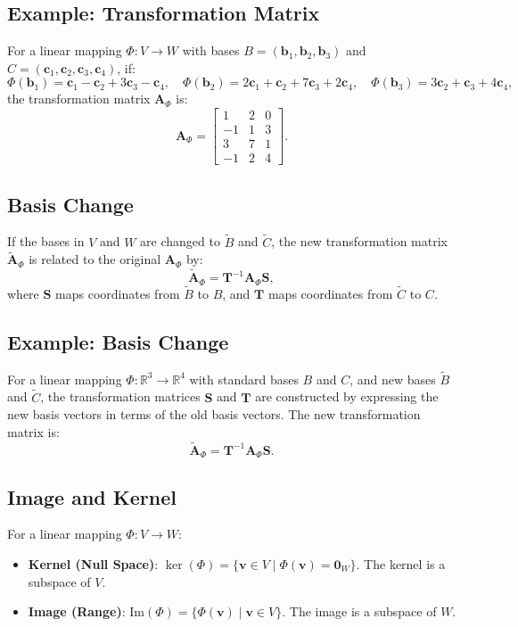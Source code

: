 \subsection{Example: Transformation Matrix}
For a linear mapping \(\Phi: V \to W\) with bases \(B = (\mathbf{b}_1, \mathbf{b}_2, \mathbf{b}_3)\) and \(C = (\mathbf{c}_1, \mathbf{c}_2, \mathbf{c}_3, \mathbf{c}_4)\), if:
\[
\Phi(\mathbf{b}_1) = \mathbf{c}_1 - \mathbf{c}_2 + 3\mathbf{c}_3 - \mathbf{c}_4, \quad \Phi(\mathbf{b}_2) = 2\mathbf{c}_1 + \mathbf{c}_2 + 7\mathbf{c}_3 + 2\mathbf{c}_4, \quad \Phi(\mathbf{b}_3) = 3\mathbf{c}_2 + \mathbf{c}_3 + 4\mathbf{c}_4,
\]
the transformation matrix \(\mathbf{A}_\Phi\) is:
\[
\mathbf{A}_\Phi = \begin{bmatrix}
1 & 2 & 0 \\
-1 & 1 & 3 \\
3 & 7 & 1 \\
-1 & 2 & 4
\end{bmatrix}.
\]

\subsection{Basis Change}
If the bases in \(V\) and \(W\) are changed to \(\tilde{B}\) and \(\tilde{C}\), the new transformation matrix \(\tilde{\mathbf{A}}_\Phi\) is related to the original \(\mathbf{A}_\Phi\) by:
\[
\tilde{\mathbf{A}}_\Phi = \mathbf{T}^{-1} \mathbf{A}_\Phi \mathbf{S},
\]
where \(\mathbf{S}\) maps coordinates from \(\tilde{B}\) to \(B\), and \(\mathbf{T}\) maps coordinates from \(\tilde{C}\) to \(C\).

\subsection{Example: Basis Change}
For a linear mapping \(\Phi: \mathbb{R}^3 \to \mathbb{R}^4\) with standard bases \(B\) and \(C\), and new bases \(\tilde{B}\) and \(\tilde{C}\), the transformation matrices \(\mathbf{S}\) and \(\mathbf{T}\) are constructed by expressing the new basis vectors in terms of the old basis vectors. The new transformation matrix is:
\[
\tilde{\mathbf{A}}_\Phi = \mathbf{T}^{-1} \mathbf{A}_\Phi \mathbf{S}.
\]

\subsection{Image and Kernel}
For a linear mapping \(\Phi: V \to W\):
\begin{itemize}
    \item \textbf{Kernel (Null Space)}: \(\ker(\Phi) = \{\mathbf{v} \in V \mid \Phi(\mathbf{v}) = \mathbf{0}_W\}\). The kernel is a subspace of \(V\).

    \item \textbf{Image (Range)}: \(\text{Im}(\Phi) = \{\Phi(\mathbf{v}) \mid \mathbf{v} \in V\}\). The image is a subspace of \(W\).
\end{itemize}

